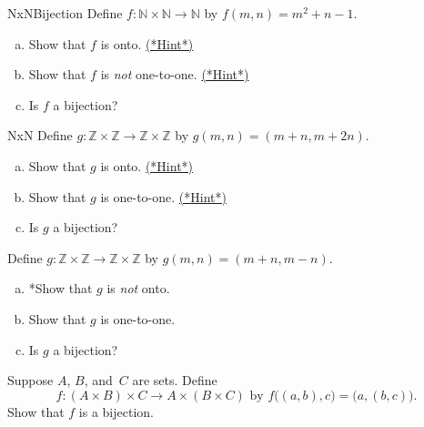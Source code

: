  
 \begin{exercise}{NxNBijection} 
 Define $f \colon \mathbb{N} \times \mathbb{N} \to \mathbb{N}$ by $f(m,n) = m^2 + n - 1$. 
 \begin{enumerate}[(a)]
 \item \label{NxNBijection-m2+n-onto}  
 Show that $f$ is onto.
 \hyperref[sec:functions:hints]{(*Hint*)}
 \item \label{NxNBijection-m2+n-not11}  
 Show that $f$ is \emph{not} one-to-one.
 \hyperref[sec:functions:hints]{(*Hint*)}
\item
Is $f$ a bijection?
 \end{enumerate}
\end{exercise}

\begin{exercise}{NxN}
Define $g \colon \mathbb{Z} \times \mathbb{Z} \to \mathbb{Z} \times \mathbb{Z}$ by $g(m,n) = (m + n, m + 2n)$. 
 \begin{enumerate}[(a)]
 \item  \label{NxNBijection-mpmn-notonto1}  
Show that $g$ is onto.
\hyperref[sec:functions:hints]{(*Hint*)} 
 \item  \label{NxNBijection-mpmn-111}  
Show that $g$ is one-to-one.
\hyperref[sec:functions:hints]{(*Hint*)}
\item
Is $g$ a bijection?
 \end{enumerate}
\end{exercise}

\begin{exercise}{}
Define $g \colon \mathbb{Z} \times \mathbb{Z} \to \mathbb{Z} \times \mathbb{Z}$ by $g(m,n) = (m + n, m - n)$. 
 \begin{enumerate}[(a)]
 \item  \label{NxNBijection-mpmn-notonto}  
*Show that $g$ is \emph{not} onto.
 \item  \label{NxNBijection-mpmn-11}  
Show that $g$ is one-to-one.
\item
Is $g$ a bijection?
 \end{enumerate}
\end{exercise}


\begin{exercise}{} \label{AxBxCBijectionEx}
Suppose $A$, $B$, and~$C$ are sets. Define 
\[
 f \colon (A \times B) \times C \to A \times (B \times C)  \text{ by } 
f\bigl( (a,b),c \bigr) = \bigl( a,(b, c) \bigr).\]
Show that $f$ is a bijection.
\end{exercise}

